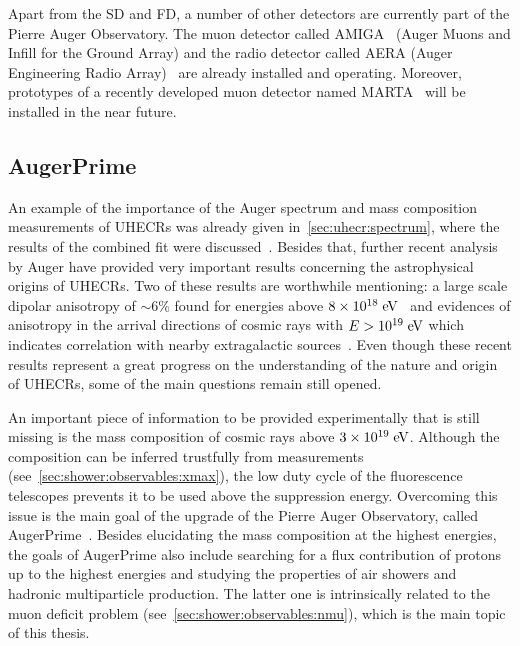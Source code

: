 Apart from the SD and FD, a number of other detectors are currently
part of the Pierre Auger Observatory.
The muon detector called AMIGA~\cite{Suarez:2013ecb,Wundheiler:2011zz,Platino:2011zz}
(Auger Muons and Infill for the Ground Array) and the radio detector
called AERA (Auger Engineering Radio Array)~\cite{Kelley:2011zz} are already installed
and operating. Moreover, prototypes of a recently developed muon detector
named MARTA~\cite{Abreu:2017vsj} will be installed in the near future.


\subsection{AugerPrime}

An example of the importance of the Auger spectrum
and mass composition measurements of UHECRs was
already given in~\cref{sec:uhecr:spectrum},
where the results of the combined fit were discussed~\cite{Aab:2016zth}. 
Besides that, further recent analysis by Auger have provided very
important results concerning the astrophysical origins of
UHECRs. Two of these results are worthwhile mentioning:
a large scale dipolar anisotropy
of $\sim 6\%$ found for energies above $8\times \mbox{$10^{18}\;\mbox{e\kern-0.1em V}$}$~\cite{Aab:2017tyv}
and evidences of anisotropy in the arrival directions
of cosmic rays with $E>\mbox{$10^{19}\;\mbox{e\kern-0.1em V}$}$ which indicates correlation with
nearby extragalactic sources~\cite{Aab:2018chp}. Even though these recent results
represent a great progress on the understanding of the nature and origin
of UHECRs, some of the main questions remain still opened.

An important piece of information to be provided experimentally that
is still missing is the mass composition of cosmic rays above $3 \times \mbox{$10^{19}\;\mbox{e\kern-0.1em V}$}$.
Although the composition can be inferred trustfully from \xmax measurements
(see~\cref{sec:shower:observables:xmax}),
the low duty cycle of the fluorescence telescopes prevents
it to be used above the suppression energy.
Overcoming this issue is the main goal of the upgrade of the Pierre Auger Observatory,
called AugerPrime~\cite{Aab:2016vlz,Martello:2017pch}.
Besides elucidating the mass composition at the highest energies,
the goals of AugerPrime also include searching for a flux contribution of protons up to the highest
energies and studying the properties of air showers and hadronic multiparticle production.
The latter one is intrinsically related
to the muon deficit problem (see~\cref{sec:shower:observables:nmu}),
which is the main topic of this thesis.

